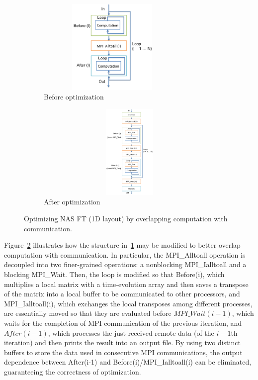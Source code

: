 \begin{figure}
  \centering
  \begin{subfigure}[b]{0.2\textwidth}
    \includegraphics[width=0.8\textwidth,height=1.8in]{fig/ft_loop.png}
    \caption{Before optimization}
    \label{fig:ft_loop}
  \end{subfigure}%
  \hspace{-.3in}
  \begin{subfigure}[b]{0.3\textwidth}
    \includegraphics[width=1.1\textwidth,height=1.8in]{fig/ft_cco.png}
    \caption{After optimization}
    \label{fig:ft_cco}
  \end{subfigure}
  \caption{Optimizing NAS FT (1D layout) by
    overlapping computation with communication. }
\label{fig:ft}
\end{figure}

Figure~\ref{fig:ft_cco} illustrates how the structure
in~\ref{fig:ft_loop} may be modified to better overlap computation
with communication.  In particular, the MPI\_Alltoall operation is
decoupled into two finer-grained operations: a nonblocking
MPI\_Ialltoall and a blocking MPI\_Wait.  Then, the loop is modified
so that Before(i), which multiplies a local matrix with a
time-evolution array and then saves a transpose of the matrix into a
local buffer to be communicated to other processors, and
MPI\_Ialltoall(i), which exchanges the local transposes among different
processes, are essentially moved so that they are evaluated before
$MPI\_Wait(i-1)$, which waits for the completion of MPI communication
of the previous iteration, and $After(i-1)$, which processes the just
received remote data (of the $i-1$th iteration) and then prints the
result into an output file.  By using two distinct buffers to store
the data used in consecutive MPI communications, the output
dependence between After(i-1) and Before(i)/MPI\_Ialltoall(i) can be
eliminated, guaranteeing the correctness of optimization.

